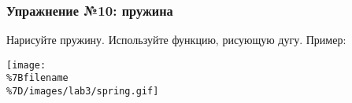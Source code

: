 \begin{Shaded}
\begin{Highlighting}[]
 
 

 
    \OperatorTok{=} \OperatorTok{*}\OperatorTok{*}\OperatorTok{/}
    \OperatorTok{=} \OperatorTok{*}\NormalTok{(}\OperatorTok{/}
      
        \OperatorTok{*}\NormalTok{(}\OperatorTok{-}

\OperatorTok{=} 
\OperatorTok{=} 
\OperatorTok{=} 

\NormalTok{)}

\NormalTok{)}

  
    \NormalTok{)}
    \OperatorTok{-}\NormalTok{)}
    \OperatorTok{+=} 
\end{Highlighting}
\end{Shaded}

\subsubsection{Упражнение №10:
пружина}\label{ux443ux43fux440ux430ux436ux43dux435ux43dux438ux435-10-ux43fux440ux443ux436ux438ux43dux430}

Нарисуйте пружину. Используйте функцию, рисующую дугу. Пример:

\texttt{[image: \\\%7Bfilename\\\%7D/images/lab3/spring.gif]}

